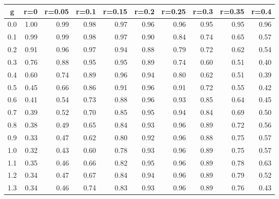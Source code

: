 %
\begin{table}[!tbp]
 \begin{center}
 \begin{tabular}{rrrrrrrrrr}\hline\hline
\multicolumn{1}{c}{g}&\multicolumn{1}{c}{r=0}&\multicolumn{1}{c}{r=0.05}&\multicolumn{1}{c}{r=0.1}&\multicolumn{1}{c}{r=0.15}&\multicolumn{1}{c}{r=0.2}&\multicolumn{1}{c}{r=0.25}&\multicolumn{1}{c}{r=0.3}&\multicolumn{1}{c}{r=0.35}&\multicolumn{1}{c}{r=0.4}\tabularnewline
\hline
0.0&1.00&0.99&0.98&0.97&0.96&0.96&0.95&0.95&0.96\tabularnewline
0.1&0.99&0.99&0.98&0.97&0.90&0.84&0.74&0.65&0.57\tabularnewline
0.2&0.91&0.96&0.97&0.94&0.88&0.79&0.72&0.62&0.54\tabularnewline
0.3&0.76&0.88&0.95&0.95&0.89&0.74&0.60&0.51&0.40\tabularnewline
0.4&0.60&0.74&0.89&0.96&0.94&0.80&0.62&0.51&0.39\tabularnewline
0.5&0.45&0.66&0.86&0.91&0.96&0.91&0.72&0.55&0.42\tabularnewline
0.6&0.41&0.54&0.73&0.88&0.96&0.93&0.85&0.64&0.45\tabularnewline
0.7&0.39&0.52&0.70&0.85&0.95&0.94&0.84&0.69&0.50\tabularnewline
0.8&0.38&0.49&0.65&0.84&0.93&0.96&0.89&0.72&0.56\tabularnewline
0.9&0.33&0.47&0.62&0.80&0.92&0.96&0.88&0.75&0.57\tabularnewline
1.0&0.32&0.43&0.60&0.78&0.93&0.96&0.89&0.75&0.57\tabularnewline
1.1&0.35&0.46&0.66&0.82&0.95&0.96&0.89&0.78&0.63\tabularnewline
1.2&0.34&0.47&0.67&0.84&0.94&0.96&0.89&0.79&0.52\tabularnewline
1.3&0.34&0.46&0.74&0.83&0.93&0.96&0.89&0.76&0.43\tabularnewline
\hline
\end{tabular}

\end{center}

\end{table}

